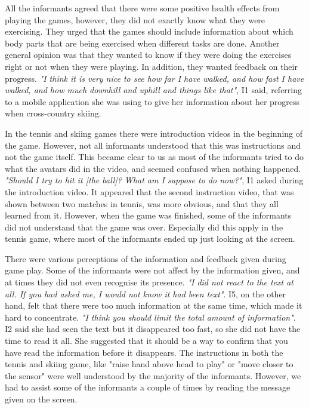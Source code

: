 All the informants agreed that there were some positive health effects from playing the games, however, they did not exactly know what they were exercising. They urged that the games should include information about which body parts that are being exercised when different tasks are done. Another general opinion was that they wanted to know if they were doing the exercises right or not when they were playing. In addition, they wanted feedback on their progress. \emph{"I think it is very nice to see how far I have walked, and how fast I have walked, and how much downhill and uphill and things like that"}, I1 said, referring to a mobile application she was using to give her information about her progress when cross-country skiing.   

In the tennis and skiing games there were introduction videos in the beginning of the game. However, not all informants understood that this was instructions and not the game itself. This became clear to us as most of the informants tried to do what the avatars did in the video, and seemed confused when nothing happened. \emph{"Should I try to hit it [the ball]? What am I suppose to do now?"}, I1 asked during the introduction video. It appeared that the second instruction video, that was shown between two matches in tennis, was more obvious, and that they all learned from it. However, when the game was finished, some of the informants did not understand that the game was over. Especially did this apply in the tennis game, where most of the informants ended up just looking at the screen. 

There were various perceptions of the information and feedback given during game play. Some of the informants were not affect by the information given, and at times they did not even recognise its presence. \emph{"I did not react to the text at all. If you had asked me, I would not know it had been text"}. I5, on the other hand, felt that there were too much information at the same time, which made it hard to concentrate. \emph{"I think you should limit the total amount of information"}. I2 said she had seen the text but it disappeared too fast, so she did not have the time to read it all. She suggested that it should be a way to confirm that you have read the information before it disappears. The instructions in both the tennis and skiing game, like "raise hand above head to play" or "move closer to the sensor" were well understood by the majority of the informants. However, we had to assist some of the informants a couple of times by reading the message given on the screen.  

